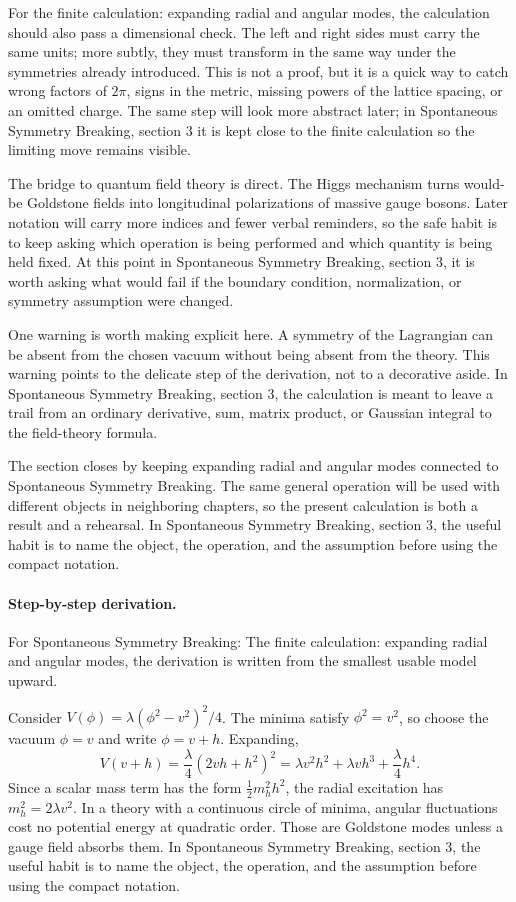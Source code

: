 For the finite calculation: expanding radial and angular modes, the calculation should also pass a dimensional check.  The left and right sides must carry the same units; more subtly, they must transform in the same way under the symmetries already introduced.  This is not a proof, but it is a quick way to catch wrong factors of \(2\pi\), signs in the metric, missing powers of the lattice spacing, or an omitted charge.  The same step will look more abstract later; in Spontaneous Symmetry Breaking, section 3 it is kept close to the finite calculation so the limiting move remains visible.

The bridge to quantum field theory is direct.  The Higgs mechanism turns would-be Goldstone fields into longitudinal polarizations of massive gauge bosons.  Later notation will carry more indices and fewer verbal reminders, so the safe habit is to keep asking which operation is being performed and which quantity is being held fixed.  At this point in Spontaneous Symmetry Breaking, section 3, it is worth asking what would fail if the boundary condition, normalization, or symmetry assumption were changed.

One warning is worth making explicit here.  A symmetry of the Lagrangian can be absent from the chosen vacuum without being absent from the theory.  This warning points to the delicate step of the derivation, not to a decorative aside.  In Spontaneous Symmetry Breaking, section 3, the calculation is meant to leave a trail from an ordinary derivative, sum, matrix product, or Gaussian integral to the field-theory formula.

The section closes by keeping expanding radial and angular modes connected to Spontaneous Symmetry Breaking.  The same general operation will be used with different objects in neighboring chapters, so the present calculation is both a result and a rehearsal.  In Spontaneous Symmetry Breaking, section 3, the useful habit is to name the object, the operation, and the assumption before using the compact notation.



\paragraph{Step-by-step derivation.}

For Spontaneous Symmetry Breaking: The finite calculation: expanding radial and angular modes, the derivation is written from the smallest usable model upward.

Consider \(V(\phi)=\lambda(\phi^2-v^2)^2/4\).  The minima satisfy \(\phi^2=v^2\), so choose the vacuum \(\phi=v\) and write \(\phi=v+h\).  Expanding,
\[
  V(v+h)=\frac{\lambda}{4}(2vh+h^2)^2
  =\lambda v^2h^2+\lambda vh^3+\frac{\lambda}{4}h^4.
\]
Since a scalar mass term has the form \(\frac12m_h^2h^2\), the radial excitation has \(m_h^2=2\lambda v^2\).  In a theory with a continuous circle of minima, angular fluctuations cost no potential energy at quadratic order.  Those are Goldstone modes unless a gauge field absorbs them.  In Spontaneous Symmetry Breaking, section 3, the useful habit is to name the object, the operation, and the assumption before using the compact notation.

